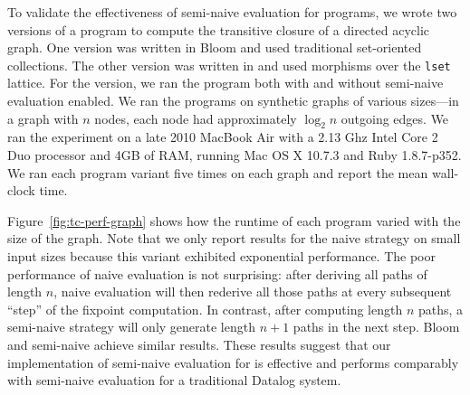 To validate the effectiveness of semi-naive evaluation for \lang programs, we
wrote two versions of a program to compute the transitive closure of a directed
acyclic graph. One version was written in Bloom and used traditional
set-oriented collections. The other version was written in \lang and used
morphisms over the \texttt{lset} lattice. For the \lang version, we ran the
program both with and without semi-naive evaluation enabled. We ran the programs
on synthetic graphs of various sizes---in a graph with $n$ nodes, each node had
approximately $\log_2 n$ outgoing edges. We ran the experiment on a late 2010
MacBook Air with a 2.13 Ghz Intel Core 2 Duo processor and 4GB of RAM, running
Mac OS X 10.7.3 and Ruby 1.8.7-p352. We ran each program variant five times on
each graph and report the mean wall-clock time.

Figure~\ref{fig:tc-perf-graph} shows how the runtime of each program varied with
the size of the graph. Note that we only report results for the naive \lang
strategy on small input sizes because this variant exhibited exponential
performance. The poor performance of naive evaluation is not surprising: after
deriving all paths of length $n$, naive evaluation will then rederive all those
paths at every subsequent ``step'' of the fixpoint computation. In contrast,
after computing length $n$ paths, a semi-naive strategy will only generate
length $n+1$ paths in the next step. Bloom and semi-naive \lang achieve similar
results. These results suggest that our implementation of semi-naive evaluation
for \lang is effective and performs comparably with semi-naive evaluation for a
traditional Datalog system.
